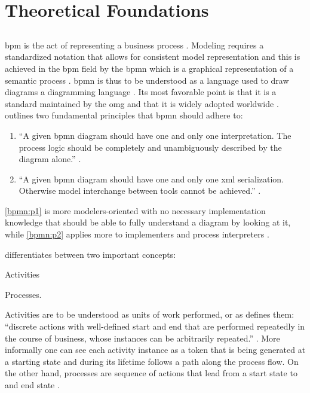 \chapter{Theoretical Foundations}
\label{ch:foundations}

\section{}
\label{sec:bpmn}

\gls{bpm} is the act of representing a business process \citep{Silver2011}. Modeling requires a standardized notation that allows for consistent model representation and this is achieved in the \gls{bpm} field by the \gls{bpmn} which is a graphical representation of a semantic process \citep{Silver2011}. \gls{bpmn} is thus to be understood as a language used to draw diagrams \ie a diagramming language \citep{Silver2011}. Its most favorable point is that it is a standard maintained by the \gls{omg} and that it is widely adopted worldwide \citep{Silver2011}. \citet{Silver2011} outlines two fundamental principles that \gls{bpmn} should adhere to:

\begin{enumerate}[label=\textbf{P. \Roman*},ref=Principle \Roman*]
 	\item ``A given \gls{bpmn} diagram should have one and only one interpretation. The process logic should be completely and unambiguously described by the diagram alone.'' \citep[p. v]{Silver2011}. \label{bpmn:p1}
 	\item ``A given \gls{bpmn} diagram should have one and only one \gls{xml} serialization. Otherwise model interchange between tools cannot be achieved.'' \citep[p. v]{Silver2011}. \label{bpmn:p2}
\end{enumerate} 

\ref{bpmn:p1} is more modelers-oriented with no necessary implementation knowledge that should be able to fully understand a diagram by looking at it, while \ref{bpmn:p2} applies more to implementers and process interpreters \citep{Silver2011}.

\citet{Silver2011} differentiates between two important concepts:
\begin{enumerate*}
	\item Activities
	\item Processes.
\end{enumerate*}
Activities are to be understood as units of work performed, or as \citet{Silver2011} defines them: ``discrete actions with well-defined start and end that are performed repeatedly in the course of business, whose instances can be arbitrarily repeated.'' \citep[p. 10]{Silver2011}. More informally one can see each activity instance as a token that is being generated at a starting state and during its lifetime follows a path along the process flow. On the other hand, processes are sequence of actions that lead from a start state to and end state \citep[p. 11]{Silver2011}.

